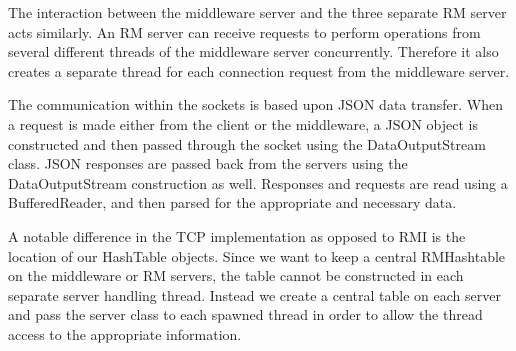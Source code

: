 \documentclass[11pt]{amsart}
\begin{document}
The interaction between the middleware server and the three separate RM server acts similarly. An RM
server can receive requests to perform operations from several different threads of the middleware
server concurrently. Therefore it also creates a separate thread for each connection request from
the middleware server. 

The communication within the sockets is based upon JSON data transfer. When a request is made
either from the client or the middleware, a JSON object is constructed and then passed through the
socket using the DataOutputStream class. JSON responses are passed back from the servers using the
DataOutputStream construction as well. Responses and requests are read using a BufferedReader, and
then parsed for the appropriate and necessary data. 

A notable difference in the TCP implementation
as opposed to RMI is the location of our HashTable objects. Since we want to keep a central
RMHashtable on the middleware or RM servers, the table cannot be constructed in each separate server
handling thread. Instead we create a central table on each server and pass the server class to each
spawned thread in order to allow the thread access to the appropriate information.
\end{document}
